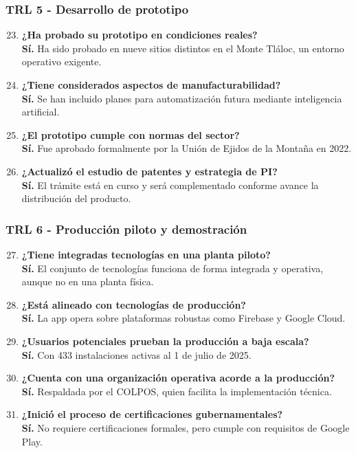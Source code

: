 \subsubsection*{TRL 5 - Desarrollo de prototipo}
\begin{enumerate}
    \setcounter{enumi}{22}
    \item \textbf{¿Ha probado su prototipo en condiciones reales?} \\ \textbf{Sí.} Ha sido probado en nueve sitios distintos en el Monte Tláloc, un entorno operativo exigente.
    
    \item \textbf{¿Tiene considerados aspectos de manufacturabilidad?} \\ \textbf{Sí.} Se han incluido planes para automatización futura mediante inteligencia artificial.
    
    \item \textbf{¿El prototipo cumple con normas del sector?} \\ \textbf{Sí.} Fue aprobado formalmente por la Unión de Ejidos de la Montaña en 2022.
    
    \item \textbf{¿Actualizó el estudio de patentes y estrategia de PI?} \\ \textbf{Sí.} El trámite está en curso y será complementado conforme avance la distribución del producto.
\end{enumerate}

\subsubsection*{TRL 6 - Producción piloto y demostración}
\begin{enumerate}
    \setcounter{enumi}{26}
    \item \textbf{¿Tiene integradas tecnologías en una planta piloto?} \\ \textbf{Sí.} El conjunto de tecnologías funciona de forma integrada y operativa, aunque no en una planta física.
    
    \item \textbf{¿Está alineado con tecnologías de producción?} \\ \textbf{Sí.} La app opera sobre plataformas robustas como Firebase y Google Cloud.
    
    \item \textbf{¿Usuarios potenciales prueban la producción a baja escala?} \\ \textbf{Sí.} Con 433 instalaciones activas al 1 de julio de 2025.
    
    \item \textbf{¿Cuenta con una organización operativa acorde a la producción?} \\ \textbf{Sí.} Respaldada por el COLPOS, quien facilita la implementación técnica.
    
    \item \textbf{¿Inició el proceso de certificaciones gubernamentales?} \\ \textbf{Sí.} No requiere certificaciones formales, pero cumple con requisitos de Google Play.
\end{enumerate}

